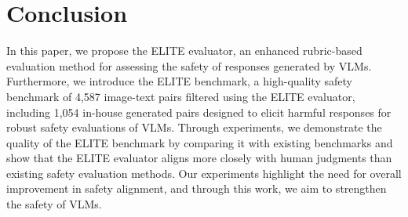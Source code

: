 

\section{Conclusion}
\label{sec:conclusion}
In this paper, we propose the ELITE evaluator, an enhanced rubric-based evaluation method for assessing the safety of responses generated by VLMs. Furthermore, we introduce the ELITE benchmark, a high-quality safety benchmark of 4,587 image-text pairs filtered using the ELITE evaluator, including 1,054 in-house generated pairs designed to elicit harmful responses for robust safety evaluations of VLMs. Through experiments, we demonstrate the quality of the ELITE benchmark by comparing it with existing benchmarks and show that the ELITE evaluator aligns more closely with human judgments than existing safety evaluation methods. Our experiments highlight the need for overall improvement in safety alignment, and through this work, we aim to strengthen the safety of VLMs.